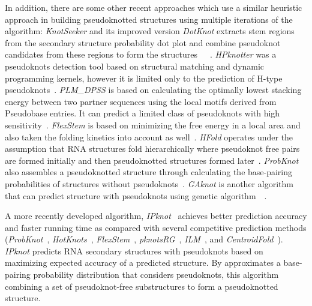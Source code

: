 \documentclass{doublecol-new}
\theoremstyle{TH}{
\newtheorem{lemma}{Lemma}
\newtheorem{theorem}[lemma]{Theorem}
\newtheorem{corrolary}[lemma]{Corrolary}
\newtheorem{conjecture}[lemma]{Conjecture}
\newtheorem{proposition}[lemma]{Proposition}
\newtheorem{claim}[lemma]{Claim}
\newtheorem{stheorem}[lemma]{Wrong Theorem}
\newtheorem{algorithm}{Algorithm}
}
\theoremstyle{THrm}{
\newtheorem{definition}{Definition}
\newtheorem{question}{Question}
\newtheorem{remark}{Remark}
\newtheorem{scheme}{Scheme}
}
\theoremstyle{THhit}{
\newtheorem{case}{Case}[section]
}
\begin{document}
In addition, there are some other recent approaches which use a similar heuristic approach in
building pseudoknotted structures using multiple iterations of the algorithm:
{\em KnotSeeker} and its improved version {\em DotKnot} extracts stem regions from the secondary 
structure probability dot plot and combine pseudoknot candidates from these regions to form the 
	structures~\cite{sperschneider2008kno}~\cite{sperschneider2010dot}~\cite{sperschneider2011heu}. 
{\em HPknotter} was a pseudoknots detection tool based on structural matching and dynamic programming kernels, however
	it is limited only to the prediction of H-type pseudoknots~\cite{Huang_2005}.
{\em PLM\_DPSS} is based on calculating the optimally lowest stacking energy between two partner 
sequences using the local motifs derived from Pseudobase entries.
It can predict a limited class of pseudoknots with high sensitivity~\cite{Huang_2007}.
{\em FlexStem} is based on minimizing the free energy in a local area and also taken the folding 
kinetics into account as well~\cite{Chen_2008}.
{\em HFold} operates under the assumption that RNA structures fold hierarchically where pseudoknot 
free pairs are formed initially and then pseudoknotted structures formed later~\cite{jabbari_2007}.
{\em ProbKnot} also assembles a pseudoknotted structure through calculating the base-pairing 
probabilities of structures without pseudoknots~\cite{bellaousov_probknot_2010}.
{\em GAknot} is another algorithm that can predict structure with pseudoknots using genetic algorithm~\cite{tong_2013}~\cite{tong_bibe_2013}. 

A more recently developed algorithm, {\em IPknot}~\cite{sato_2011} achieves better prediction 
accuracy and faster running time as compared with several competitive prediction 
methods ({\em ProbKnot}~\cite{bellaousov_probknot_2010}, 
{\em HotKnots}~\cite{ren_2005}, {\em FlexStem}~\cite{Chen_2008},
{\em pknotsRG}~\cite{reeder_2004}, {\em ILM}~\cite{ruan_2004}, and {\em CentroidFold}~\cite{sato_2009}).
{\em IPknot} predicts RNA secondary structures with pseudoknots based on maximizing
expected accuracy of a predicted structure.
By approximates a base-pairing probability distribution that
considers pseudoknots, this algorithm
combining a set of pseudoknot-free substructures to form
a pseudoknotted structure.
\end{document}
